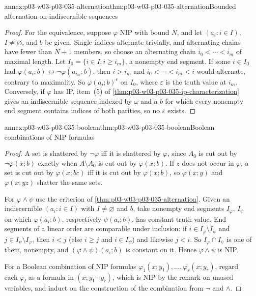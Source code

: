 \begin{annexitem}{annex:p03-w03-p03-035-alternation}{thm:p03-w03-p03-035-alternation}{Bounded alternation on indiscernible sequences}
\begin{proof}
For the equivalence, suppose \(\varphi\) NIP with bound \(N\), and let
\((a_i:i\in I)\), \(I\neq\varnothing\), and \(b\) be given.  Single indices
alternate trivially, and alternating chains have fewer than \(N+1\) members,
so choose an alternating chain \(i_0<\cdots<i_m\) of maximal length.  Let
\(I_0=\{i\in I:i\geq i_m\}\), a nonempty end segment.  If some \(i\in I_0\)
had \(\varphi(a_i;b)\leftrightarrow\neg\varphi(a_{i_m};b)\), then \(i>i_m\)
and \(i_0<\cdots<i_m<i\) would alternate, contrary to maximality.  So
\(\varphi(a_i;b)^{\varepsilon}\) on \(I_0\), where \(\varepsilon\) is the truth
value at \(i_m\).  Conversely, if \(\varphi\) has IP, item~(5) of
\cref{thm:p03-w03-p03-035-ip-characterization} gives an indiscernible
sequence indexed by \(\omega\) and a \(b\) for which every nonempty end
segment contains indices of both parities, so no \(\varepsilon\) exists.
\end{proof}
\end{annexitem}

\begin{annexitem}{annex:p03-w03-p03-035-boolean}{thm:p03-w03-p03-035-boolean}{Boolean combinations of NIP formulas}
\begin{proof}
A set is shattered by \(\neg\varphi\) iff it is shattered by \(\varphi\), since
\(A_0\) is cut out by \(\neg\varphi(x;b)\) exactly when \(A\setminus A_0\) is cut
out by \(\varphi(x;b)\).  If \(z\) does not occur in \(\varphi\), a set is cut
out by \(\varphi(x;bc)\) iff it is cut out by \(\varphi(x;b)\), so
\(\varphi(x;y)\) and \(\varphi(x;yz)\) shatter the same sets.

For \(\varphi\wedge\psi\) use the criterion of
\cref{thm:p03-w03-p03-035-alternation}.  Given an indiscernible
\((a_i:i\in I)\) with \(I\neq\varnothing\) and \(b\), take nonempty end
segments \(I_\varphi\), \(I_\psi\) on which \(\varphi(a_i;b)\), respectively
\(\psi(a_i;b)\), has constant truth value.  End segments of a linear order are
comparable under inclusion: if \(i\in I_\varphi\setminus I_\psi\) and
\(j\in I_\psi\setminus I_\varphi\), then \(i<j\) (else \(i\geq j\) and
\(i\in I_\psi\)) and likewise \(j<i\).  So \(I_\varphi\cap I_\psi\) is one of
them, nonempty, and \((\varphi\wedge\psi)(a_i;b)\) is constant on it.  Hence
\(\varphi\wedge\psi\) is NIP.

For a Boolean combination of NIP formulas \(\varphi_1(x;y_1),\ldots,
\varphi_r(x;y_r)\), regard each \(\varphi_l\) as a formula in
\((x;y_1\cdots y_r)\), which is NIP by the remark on unused variables, and
induct on the construction of the combination from \(\neg\) and \(\wedge\).
\end{proof}
\end{annexitem}

